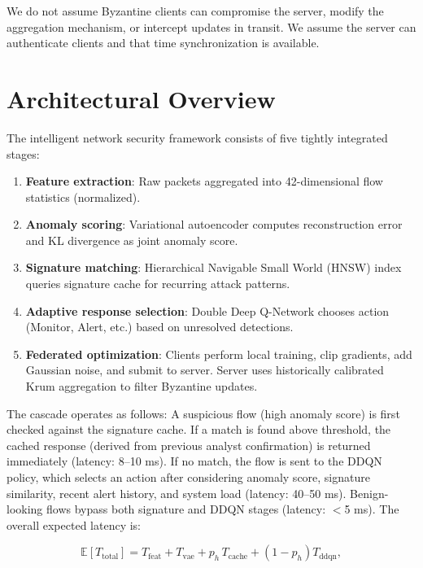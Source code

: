 \documentclass[preprint,12pt]{elsarticle}
\begin{document}
We do not assume Byzantine clients can compromise the server, modify the aggregation mechanism, or intercept updates in transit. We assume the server can authenticate clients and that time synchronization is available.

\section{Architectural Overview}
\label{sec:system}

The intelligent network security framework consists of five tightly integrated stages:

\begin{enumerate}[label=(\arabic*),leftmargin=1.3em]
    \item \textbf{Feature extraction}: Raw packets aggregated into 42-dimensional flow statistics (normalized).
    \item \textbf{Anomaly scoring}: Variational autoencoder computes reconstruction error and KL divergence as joint anomaly score.
    \item \textbf{Signature matching}: Hierarchical Navigable Small World (HNSW) index queries signature cache for recurring attack patterns.
    \item \textbf{Adaptive response selection}: Double Deep Q-Network chooses action (Monitor, Alert, etc.) based on unresolved detections.
    \item \textbf{Federated optimization}: Clients perform local training, clip gradients, add Gaussian noise, and submit to server. Server uses historically calibrated Krum aggregation to filter Byzantine updates.
\end{enumerate}

The cascade operates as follows: A suspicious flow (high anomaly score) is first checked against the signature cache. If a match is found above threshold, the cached response (derived from previous analyst confirmation) is returned immediately (latency: 8--10 ms). If no match, the flow is sent to the DDQN policy, which selects an action after considering anomaly score, signature similarity, recent alert history, and system load (latency: 40--50 ms). Benign-looking flows bypass both signature and DDQN stages (latency: $<$5 ms). The overall expected latency is:

\begin{equation}
\mathbb{E}[T_{\text{total}}] = T_{\text{feat}} + T_{\text{vae}} + p_h \, T_{\text{cache}} + (1-p_h) T_{\text{ddqn}},
\label{eq:latency_model}
\end{equation}
\end{document}
